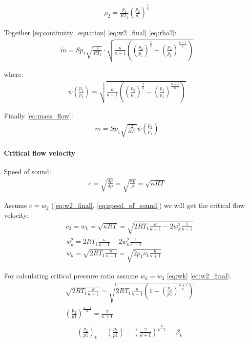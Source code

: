 \begin{align}
    \rho_2 = \frac{p_1}{RT_1} (\frac{p_2}{p_1})^{\frac{1}{\kappa}}
    \label{eq:rho2}
\end{align}

Together \ref{eq:continuity_equation} \ref{eq:w2_final} \ref{eq:rho2}:
\begin{align}
    \dot{m} = S p_1 \sqrt{\frac{2}{RT_1}} \cdot
    \sqrt{\frac{\kappa}{\kappa-1}\left(\left(\frac{p_2}{p_1}\right)^\frac{2}{\kappa} -
    \left(\frac{p_2}{p_1}\right)^\frac{\kappa + 1}{\kappa}\right)}
    \label{}
\end{align}

where: 
\begin{align}
    \psi\left(\frac{p_2}{p_1}\right) =  
    \sqrt{\frac{\kappa}{\kappa-1}\left(\left(\frac{p_2}{p_1}\right)^\frac{2}{\kappa} -
    \left(\frac{p_2}{p_1}\right)^\frac{\kappa + 1}{\kappa}\right)}
    \label{eq:psi}
\end{align}

Finally \ref{eq:mass_flow}:
\begin{align}
    \dot{m} = Sp_1\sqrt{\frac{2}{RT_1}} \psi\left(\frac{p_2}{p_1}\right)
    \label{eq:mass_flow}
\end{align}

\paragraph{Critical flow velocity}
Speed of sound:
\begin{align}
    c = \sqrt{\frac{dp}{d\rho}} = 
    \sqrt{\frac{\kappa p}{\rho}} = \sqrt{\kappa R T}
    \label{eq:speed_of_sound}
\end{align}

Assume $c=w_2$ (\ref{eq:w2_final}, \ref{eq:speed_of_sound}) we will get the
critical flow velocity:
\begin{align}
    &c_2 = w_k = \sqrt{\kappa RT} =
    \sqrt{2RT_1\frac{\kappa}{\kappa-1}-2w_k^2\frac{1}{\kappa-1}} \\
    &w_k^2 = 2RT_1\frac{\kappa}{\kappa-1}-2w_k^2\frac{1}{\kappa-1} \\
    &w_k = \sqrt{2RT_1\frac{\kappa}{\kappa-1}} = \sqrt{2p_1 \nu_1 \frac{\kappa}{\kappa + 1}}
    \label{eq:wk}
\end{align}


For calculating critical pressure ratio assume $w_k = w_2$ \ref{eq:wk}
\ref{eq:w2_final}:
\begin{align}
    &\sqrt{2RT_1\frac{\kappa}{\kappa-1}}  = 
    \sqrt{2RT_1 \frac{\kappa}{\kappa-1}
    \left(1-\left(\frac{p_2}{p1}\right)^{\frac{\kappa+1}{\kappa}}\right)} \\
    &\left(\frac{p_2}{p1}\right)^\frac{\kappa-1}{\kappa} = \frac{2}{\kappa+1} \\
\end{align}
\begin{align}
    &\left(\frac{p_2}{p1}\right)_k =
    \left(\frac{p_k}{p1}\right) =
    \left(\frac{2}{\kappa+1}\right)^\frac{\kappa}{\kappa-1}=\beta_k
    \label{eq:beta_k}
\end{align}

